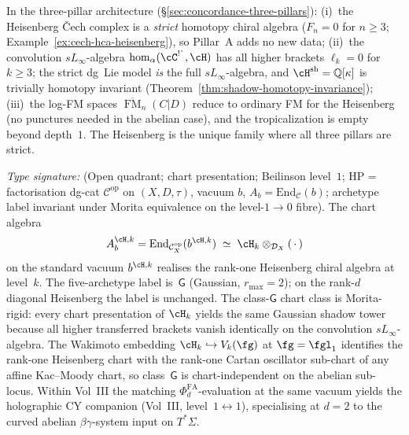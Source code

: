 \begin{remark}
\label{rem:heisenberg-three-pillar}
In the three-pillar architecture
(\S\ref{sec:concordance-three-pillars}):
(i)~the Heisenberg \v{C}ech complex is a \emph{strict} homotopy chiral
algebra ($F_n = 0$ for $n \geq 3$;
Example~\ref{ex:cech-hca-heisenberg}), so Pillar~A adds no new data;
(ii)~the convolution $sL_\infty$-algebra
$\operatorname{hom}_\alpha(\cC^{\textup{!\textasciigrave}}, \cH)$ has all higher
brackets $\ell_k = 0$ for $k \geq 3$; the strict dg~Lie model
\emph{is} the full $sL_\infty$-algebra, and
$\cH^{\mathrm{sh}} = \mathbb{Q}[\kappa]$ is trivially homotopy
invariant (Theorem~\ref{thm:shadow-homotopy-invariance});
(iii)~the log-FM spaces $\overline{\operatorname{FM}}_n(C|D)$ reduce to
ordinary FM for the Heisenberg (no punctures needed in the abelian case),
and the tropicalization is empty beyond depth~$1$.
The Heisenberg is the unique family where all three pillars are strict.
\end{remark}

\begin{remark}
\label{rem:heisenberg-chart-class-enumeration}
\emph{Type signature:} (Open quadrant; chart presentation;
Beilinson level~$1$; HP = factorisation dg-cat
$\mathcal{C}^{\mathrm{op}}$ on $(X, D, \tau)$, vacuum $b$,
$A_b = \mathrm{End}_\mathcal{C}(b)$; archetype label invariant
under Morita equivalence on the level-$1\to 0$ fibre).
The chart algebra
\[
A_b^{\cH, k} = \mathrm{End}_{\mathcal{C}^{\mathrm{op}}_X}(b^{\cH,k})
\;\simeq\; \cH_k\otimes_{\mathcal{D}_X}(\,\cdot\,)
\]
on the standard vacuum $b^{\cH,k}$ realises the rank-one Heisenberg
chiral algebra at level~$k$. The five-archetype label is~$\mathsf{G}$
(Gaussian, $r_{\max}=2$); on the rank-$d$ diagonal Heisenberg
the label is unchanged. The class-$\mathsf{G}$ chart class is
Morita-rigid: every chart presentation of $\cH_k$ yields the same
Gaussian shadow tower because all higher transferred brackets vanish
identically on the convolution $sL_\infty$-algebra. The Wakimoto
embedding $\cH_k\hookrightarrow V_k(\fg)$ at $\fg=\fgl_1$ identifies
the rank-one Heisenberg chart with the rank-one Cartan oscillator
sub-chart of any affine Kac--Moody chart, so class~$\mathsf{G}$ is
chart-independent on the abelian sub-locus. Within Vol~III the
matching $\Phi_d^{\mathrm{FA}}$-evaluation at the same vacuum yields
the holographic CY companion (Vol~III, level~$1\leftrightarrow 1$),
specialising at $d=2$ to the curved abelian
$\beta\gamma$-system input on $T^*\Sigma$.
\end{remark}

